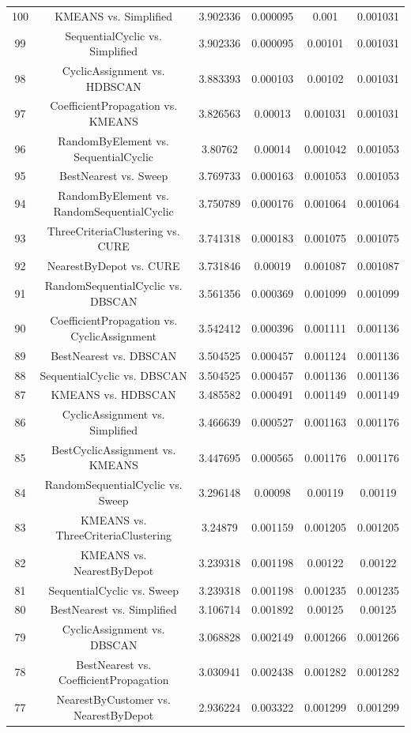 \documentclass[a4paper,10pt]{article}
\begin{document}
\begin{landscape}
\begin{table}[!htp]
\begin{tabular}{cccccc}
100&KMEANS vs. Simplified&3.902336&0.000095&0.001&0.001031\\
99&SequentialCyclic vs. Simplified&3.902336&0.000095&0.00101&0.001031\\
98&CyclicAssignment vs. HDBSCAN&3.883393&0.000103&0.00102&0.001031\\
97&CoefficientPropagation vs. KMEANS&3.826563&0.00013&0.001031&0.001031\\
96&RandomByElement vs. SequentialCyclic&3.80762&0.00014&0.001042&0.001053\\
95&BestNearest vs. Sweep&3.769733&0.000163&0.001053&0.001053\\
94&RandomByElement vs. RandomSequentialCyclic&3.750789&0.000176&0.001064&0.001064\\
93&ThreeCriteriaClustering vs. CURE&3.741318&0.000183&0.001075&0.001075\\
92&NearestByDepot vs. CURE&3.731846&0.00019&0.001087&0.001087\\
91&RandomSequentialCyclic vs. DBSCAN&3.561356&0.000369&0.001099&0.001099\\
90&CoefficientPropagation vs. CyclicAssignment&3.542412&0.000396&0.001111&0.001136\\
89&BestNearest vs. DBSCAN&3.504525&0.000457&0.001124&0.001136\\
88&SequentialCyclic vs. DBSCAN&3.504525&0.000457&0.001136&0.001136\\
87&KMEANS vs. HDBSCAN&3.485582&0.000491&0.001149&0.001149\\
86&CyclicAssignment vs. Simplified&3.466639&0.000527&0.001163&0.001176\\
85&BestCyclicAssignment vs. KMEANS&3.447695&0.000565&0.001176&0.001176\\
84&RandomSequentialCyclic vs. Sweep&3.296148&0.00098&0.00119&0.00119\\
83&KMEANS vs. ThreeCriteriaClustering&3.24879&0.001159&0.001205&0.001205\\
82&KMEANS vs. NearestByDepot&3.239318&0.001198&0.00122&0.00122\\
81&SequentialCyclic vs. Sweep&3.239318&0.001198&0.001235&0.001235\\
80&BestNearest vs. Simplified&3.106714&0.001892&0.00125&0.00125\\
79&CyclicAssignment vs. DBSCAN&3.068828&0.002149&0.001266&0.001266\\
78&BestNearest vs. CoefficientPropagation&3.030941&0.002438&0.001282&0.001282\\
77&NearestByCustomer vs. NearestByDepot&2.936224&0.003322&0.001299&0.001299\\

\end{tabular}
\end{table}
\end{landscape}
\end{document}
